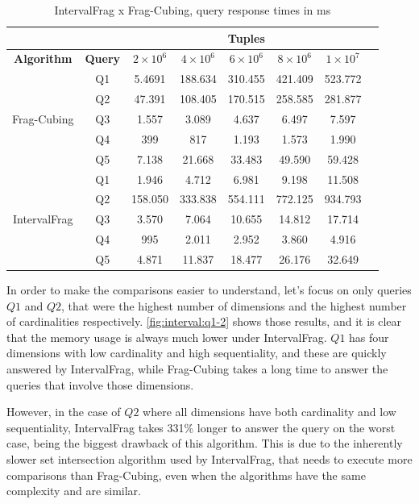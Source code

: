 \begin{table}[!ht]
  \centering
  \caption{IntervalFrag x Frag-Cubing, query response times in ms}\label{tab:interval_query}
  \begin{tabular}{|c|c|c|c|c|c|c|c|}
    \hline
    & & \multicolumn{5}{c|}{\textbf{Tuples}} \\
    \hline
    \bfseries Algorithm & \bfseries Query & \bfseries $2\times10^6$ & \bfseries $4\times10^6$ & \bfseries $6\times10^6$ & \bfseries $8\times10^6$ & \bfseries $1\times10^7$\\
    \hline
    \multirow{5}{*}{Frag-Cubing} & Q1 &
    5.4691 & 188.634 & 310.455 & 421.409 & 523.772
    \\\cline{2-7} & Q2 &
    47.391 & 108.405 & 170.515 & 258.585 & 281.877
    \\\cline{2-7} & Q3 &
    1.557 & 3.089 & 4.637 & 6.497 & 7.597
    \\\cline{2-7} & Q4 &
    399 & 817 & 1.193 & 1.573 & 1.990
    \\\cline{2-7} & Q5 &
    7.138 & 21.668 & 33.483 & 49.590 & 59.428
    \\\hline
    \multirow{5}{*}{IntervalFrag} & Q1 &
    1.946 & 4.712 & 6.981 & 9.198 & 11.508
    \\\cline{2-7}
    & Q2 &
    158.050 & 333.838 & 554.111 & 772.125 & 934.793
    \\\cline{2-7} & Q3 &
    3.570 & 7.064 & 10.655 & 14.812 & 17.714
    \\\cline{2-7}
    & Q4 &
    995 & 2.011 & 2.952 & 3.860 & 4.916
    \\\cline{2-7}
    & Q5 &
    4.871 & 11.837 & 18.477 & 26.176 & 32.649
    \\\hline
  \end{tabular}
\end{table}

In order to make the comparisons easier to understand, let's focus on only queries $Q1$ and $Q2$, that were the highest number of dimensions and the highest number of cardinalities respectively.
\autoref{fig:interval:q1-2} shows those results, and it is clear that the memory usage is always much lower under IntervalFrag.
$Q1$ has four dimensions with low cardinality and high sequentiality, and these are quickly answered by IntervalFrag, while Frag-Cubing takes a long time to answer the queries that involve those dimensions.

However, in the case of $Q2$ where all dimensions have both cardinality and low sequentiality, IntervalFrag takes 331\% longer to answer the query on the worst case, being the biggest drawback of this algorithm.
This is due to the inherently slower set intersection algorithm used by IntervalFrag, that needs to execute more comparisons than Frag-Cubing, even when the algorithms have the same complexity and are similar.

